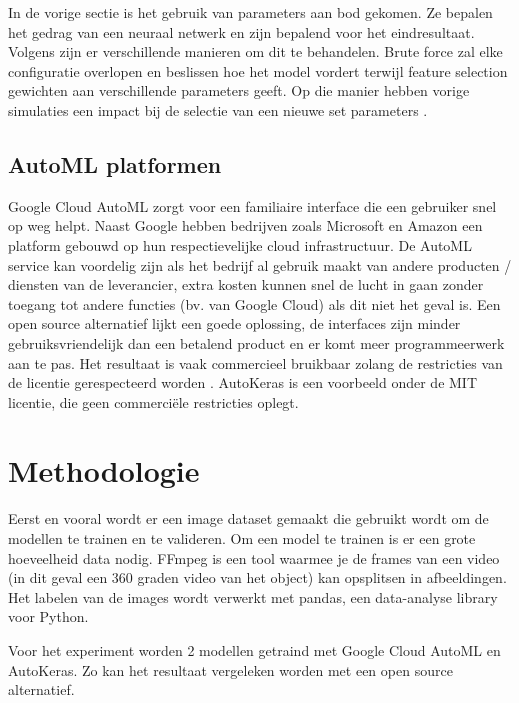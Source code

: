 In de vorige sectie is het gebruik van parameters aan bod gekomen. Ze bepalen het gedrag van een neuraal netwerk en zijn bepalend voor het eindresultaat. Volgens \textcite{Brust2019} zijn er verschillende manieren om dit te behandelen. Brute force zal elke configuratie overlopen en beslissen hoe het model vordert terwijl feature selection gewichten aan verschillende parameters geeft. Op die manier hebben vorige simulaties een impact bij de selectie van een nieuwe set parameters \autocite{Claesen2015}.

\subsection{AutoML platformen}

Google Cloud AutoML zorgt voor een familiaire interface die een gebruiker snel op weg helpt. Naast Google hebben bedrijven zoals Microsoft en Amazon een platform gebouwd op hun respectievelijke cloud infrastructuur. De AutoML service kan voordelig zijn als het bedrijf al gebruik maakt van andere producten / diensten van de leverancier, extra kosten kunnen snel de lucht in gaan zonder toegang tot andere functies (bv. van Google Cloud) als dit niet het geval is. Een open source alternatief lijkt een goede oplossing, de interfaces zijn minder gebruiksvriendelijk dan een betalend product en er komt meer programmeerwerk aan te pas. Het resultaat is vaak commercieel bruikbaar zolang de restricties van de licentie gerespecteerd worden \autocite{Balter2015}. AutoKeras is een voorbeeld onder de MIT licentie, die geen commerciële restricties oplegt.

\section{Methodologie}
\label{sec:methodologie}

Eerst en vooral wordt er een image dataset gemaakt die gebruikt wordt om de modellen te trainen en te valideren. Om een model te trainen is er een grote hoeveelheid data nodig. FFmpeg is een tool waarmee je de frames van een video (in dit geval een 360 graden video van het object) kan opsplitsen in afbeeldingen. Het labelen van de images wordt verwerkt met pandas, een data-analyse library voor Python.

Voor het experiment worden 2 modellen getraind met Google Cloud AutoML en AutoKeras. Zo kan het resultaat vergeleken worden met een open source alternatief. 

